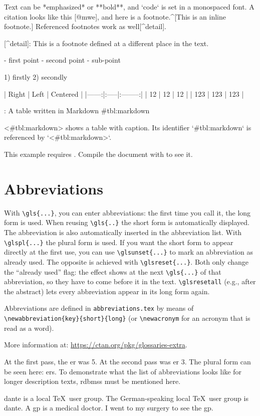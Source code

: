\documentclass[../thesis-example-en]{subfiles}
\begin{document}
  \begin{ltgexample}
  \begin{markdown}
Text can be *emphasized* or **bold**, and `code` is set in a monospaced font.
A citation looks like this [@mwe], and here is a footnote.^[This is an inline footnote.]
Referenced footnotes work as well[^detail].

[^detail]: This is a footnote defined at a different place in the text.

- first point
- second point
  - sub-point

1) firstly
2) secondly

| Right | Left | Centered |
|------:|:-----|:--------:|
|    12 | 12   |    12    |
|   123 | 123  |   123    |

: A table written in Markdown {#tbl:markdown}

<#tbl:markdown> shows a table with caption.
Its identifier `{#tbl:markdown}` is referenced by `<#tbl:markdown>`.
\end{markdown}
  \end{ltgexample}
\else
  This example requires .
  Compile the document with  to see it.
\fi

\section{Abbreviations}

With \verb+\gls{...}+, you can enter abbreviations: the first time you call it, the long form is used.
When reusing \verb+\gls{..}+ the short form is automatically displayed.
The abbreviation is also automatically inserted in the abbreviation list.
With \verb+\glspl{...}+ the plural form is used.
If you want the short form to appear directly at the first use, you can use \verb+\glsunset{...}+ to mark an abbreviation as already used.
The opposite is achieved with \verb+\glsreset{...}+.
Both only change the ``already used'' flag: the effect shows at the next \verb+\gls{...}+ of that abbreviation, so they have to come before it in the text.
\verb+\glsresetall+ (e.g., after the abstract) lets every abbreviation appear in its long form again.

Abbreviations are defined in \verb+abbreviations.tex+ by means of \verb+\newabbreviation{key}{short}{long}+ (or \verb+\newacronym+ for an acronym that is read as a word).

More information at: \url{https://ctan.org/pkg/glossaries-extra}.

\begin{ltgexample}
At the first pass, the \gls{er} was 5.
At the second pass was \gls{er} 3.
The plural form can be seen here: \glspl{er}.
To demonstrate what the list of abbreviations looks like for longer description texts, \glspl{rdbms} must be mentioned here.

\gls{dante} is a local \TeX\ user group.
The German-speaking local \TeX\ user group is \gls{dante}.
A \gls{gp} is a medical doctor.
I went to my surgery to see the \gls{gp}.
\end{ltgexample}
\end{document}

